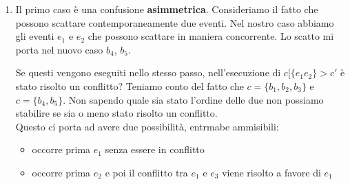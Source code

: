 \begin{enumerate}
    \item Il primo caso è una confusione \textbf{asimmetrica}. Consideriamo il fatto che possono scattare contemporaneamente due eventi.
    Nel nostro caso abbiamo gli eventi $e_1$ e $e_2$ che possono scattare in maniera concorrente. Lo scatto mi porta nel nuovo caso $b_4$, $b_5$.
    \begin{center}
    \end{center}
    Se questi vengono eseguiti nello stesso passo, nell'esecuzione di $c[\{e_1e_2\} > c'$ è stato risolto un conflitto? Teniamo conto del fatto che $c = \{b_1,b_2,b_3\} $ e $c = \{b_4,b_5\}$. Non sapendo quale sia stato l'ordine delle due non possiamo stabilire se sia o meno stato risolto un conflitto. \\
    Questo ci porta ad avere due possibilità, entrmabe ammisibili:
    \begin{itemize}
        \item occorre prima $e_1$ senza essere in conflitto 
        \item occorre prima $e_2$ e poi il conflitto tra $e_1$ e $e_3$ viene risolto a favore di $e_1$

\end{itemize}
\end{enumerate}
